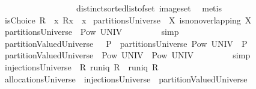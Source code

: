 \begin{isabellebody}
\ \ \ \ \ \ \ \ \ \ \ \ \ \ \ \ \ \ distinct{\isacharunderscore}sorted{\isacharunderscore}list{\isacharunderscore}of{\isacharunderscore}set\ image{\isacharunderscore}set\ \isamarkupfalse%
\ metis%
\endisatagproof
{\isafoldproof}%
%
\isadelimproof
%
\endisadelimproof
%
\isamarkuptrue%
\isamarkupfalse%
\ {\isachardoublequoteopen}isChoice\ R\ {\isacharequal}{\isacharequal}\ {\isasymforall}x{\isachardot}\ R{\isacharbackquote}{\isacharbackquote}{\isacharbraceleft}x{\isacharbraceright}\ {\isasymsubseteq}\ x{\isachardoublequoteclose}\isanewline
{}\isamarkupfalse%
\ {\isachardoublequoteopen}partitionsUniverse\ {\isacharequal}{\isacharequal}\ {\isacharbraceleft}X{\isachardot}\ is{\isacharunderscore}non{\isacharunderscore}overlapping\ X{\isacharbraceright}{\isachardoublequoteclose}\isanewline
{}\isamarkupfalse%
\ {\isachardoublequoteopen}partitionsUniverse\ {\isasymsubseteq}\ Pow\ UNIV{\isachardoublequoteclose}\ \isanewline
%
\isadelimproof
\ \ \ \ \ \ %
\endisadelimproof
%
\isatagproof
{}\isamarkupfalse%
\ simp%
\endisatagproof
{\isafoldproof}%
%
\isadelimproof
\ \ \ \ \ \ \ \isanewline
%
\endisadelimproof
\isanewline
{}\isamarkupfalse%
\ {\isachardoublequoteopen}partitionValuedUniverse\ {\isacharequal}{\isacharequal}\ {\isasymUnion}\ P\ {\isasymin}\ partitionsUniverse{\isachardot}\ Pow\ {\isacharparenleft}UNIV\ {\isasymtimes}\ P{\isacharparenright}{\isachardoublequoteclose}\isanewline
{}\isamarkupfalse%
\ {\isachardoublequoteopen}partitionValuedUniverse\ {\isasymsubseteq}\ Pow\ {\isacharparenleft}UNIV\ {\isasymtimes}\ {\isacharparenleft}Pow\ UNIV{\isacharparenright}{\isacharparenright}{\isachardoublequoteclose}\ \isanewline
%
\isadelimproof
\ \ \ \ \ \ %
\endisadelimproof
%
\isatagproof
{}\isamarkupfalse%
\ simp%
\endisatagproof
{\isafoldproof}%
%
\isadelimproof
\isanewline
%
\endisadelimproof
\isanewline
{}\isamarkupfalse%
\ {\isachardoublequoteopen}injectionsUniverse\ {\isacharequal}{\isacharequal}\ {\isacharbraceleft}R{\isachardot}\ {\isacharparenleft}runiq\ R{\isacharparenright}\ {\isacharampersand}\ {\isacharparenleft}runiq\ {\isacharparenleft}R{\isacharcircum}{\isacharminus}{}{\isacharparenright}{\isacharparenright}{\isacharbraceright}{\isachardoublequoteclose}\isanewline
\isanewline
\isanewline
{}\isamarkupfalse%
\ {\isachardoublequoteopen}allocationsUniverse\ {\isacharequal}{\isacharequal}\ injectionsUniverse\ {\isasyminter}\ partitionValuedUniverse{\isachardoublequoteclose}\isanewline

\end{isabellebody}
